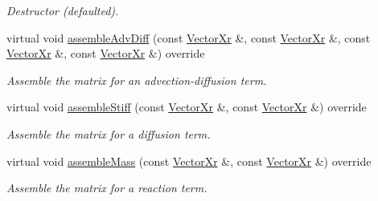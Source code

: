 \begin{DoxyCompactItemize}
\begin{DoxyCompactList}\small\item\em Destructor (defaulted). \end{DoxyCompactList}\item 
virtual void \hyperlink{classBim1D_a87a3b65a453d6fee3aa04e0b63b3b16d}{assemble\-Adv\-Diff} (const \hyperlink{typedefs_8h_aae6cee78ed9cd8f234ed8cb48682548a}{Vector\-Xr} \&, const \hyperlink{typedefs_8h_aae6cee78ed9cd8f234ed8cb48682548a}{Vector\-Xr} \&, const \hyperlink{typedefs_8h_aae6cee78ed9cd8f234ed8cb48682548a}{Vector\-Xr} \&, const \hyperlink{typedefs_8h_aae6cee78ed9cd8f234ed8cb48682548a}{Vector\-Xr} \&) override
\begin{DoxyCompactList}\small\item\em Assemble the matrix for an advection-\/diffusion term. \end{DoxyCompactList}\item 
virtual void \hyperlink{classBim1D_a9afebaa0bb7d919ece20a533ef000921}{assemble\-Stiff} (const \hyperlink{typedefs_8h_aae6cee78ed9cd8f234ed8cb48682548a}{Vector\-Xr} \&, const \hyperlink{typedefs_8h_aae6cee78ed9cd8f234ed8cb48682548a}{Vector\-Xr} \&) override
\begin{DoxyCompactList}\small\item\em Assemble the matrix for a diffusion term. \end{DoxyCompactList}\item 
virtual void \hyperlink{classBim1D_afd5e07bb246bdacd59eefb7a3396e650}{assemble\-Mass} (const \hyperlink{typedefs_8h_aae6cee78ed9cd8f234ed8cb48682548a}{Vector\-Xr} \&, const \hyperlink{typedefs_8h_aae6cee78ed9cd8f234ed8cb48682548a}{Vector\-Xr} \&) override
\begin{DoxyCompactList}\small\item\em Assemble the matrix for a reaction term. \end{DoxyCompactList}\end{DoxyCompactItemize}
